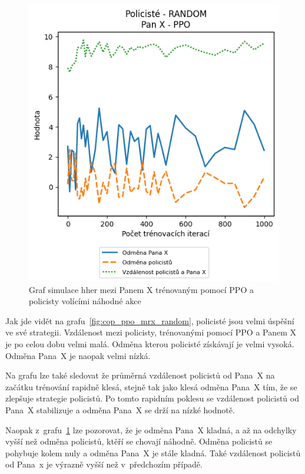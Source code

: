 \begin{figure}[H]
\begin{minipage}{.48\textwidth}
    \includegraphics[width=1\textwidth]{obrazky-figures/graphs/cop_RANDOM_mrx_PPO}
      \caption{Graf simulace hher mezi Panem X trénovaným pomocí PPO a policisty volícími náhodné akce}
      \label{fig:cop_random_mrx_ppo}
  \end{minipage}
  \end{figure}

Jak jde vidět na grafu~\ref{fig:cop_ppo_mrx_random}, policisté jsou velmi úspěšní ve své strategii.
Vzdálenost mezi policisty, trénovanými pomocí PPO a Panem X je po celou dobu velmi malá.
Odměna kterou policisté získávají je velmi vysoká.
Odměna Pana~X je naopak velmi nízká.

Na grafu lze také sledovat že průměrná vzdálenost policistů od Pana~X na začátku trénování rapidně klesá, stejně tak jako klesá odměna Pana~X tím, že se zlepšuje strategie policistů.
Po tomto rapidním poklesu se vzdálenost policistů od Pana~X stabilizuje a odměna Pana~X se drží na nízké hodnotě.

Naopak z~grafu~\ref{fig:cop_random_mrx_ppo} lze pozorovat, že je odměna Pana~X kladná, a až na odchylky vyšší než odměna policistů, ktěří se chovají náhodně.
Odměna policistů se pohybuje kolem nuly a odměna Pana~X je stále kladná.
Také vzdálenost policistů od Pana~x je výrazně vyšší než v~předchozím případě.

